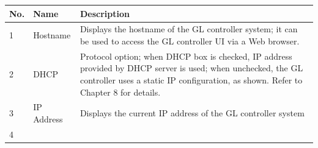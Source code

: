 \begin{longtable}[]{@{}lll@{}}
\toprule
\begin{minipage}[b]{0.04\columnwidth}\raggedright
No.\strut
\end{minipage} & \begin{minipage}[b]{0.23\columnwidth}\raggedright
Name\strut
\end{minipage} & \begin{minipage}[b]{0.65\columnwidth}\raggedright
Description\strut
\end{minipage}\tabularnewline
\midrule
\endhead
\begin{minipage}[t]{0.04\columnwidth}\raggedright
1\strut
\end{minipage} & \begin{minipage}[t]{0.23\columnwidth}\raggedright
Hostname\strut
\end{minipage} & \begin{minipage}[t]{0.65\columnwidth}\raggedright
Displays the hostname of the GL controller system; it can be used to
access the GL controller UI via a Web browser.\strut
\end{minipage}\tabularnewline
\begin{minipage}[t]{0.04\columnwidth}\raggedright
2\strut
\end{minipage} & \begin{minipage}[t]{0.23\columnwidth}\raggedright
DHCP\strut
\end{minipage} & \begin{minipage}[t]{0.65\columnwidth}\raggedright
Protocol option; when DHCP box is checked, IP address provided by DHCP
server is used; when unchecked, the GL controller uses a static IP
configuration, as shown. Refer to Chapter 8 for details.\strut
\end{minipage}\tabularnewline
\begin{minipage}[t]{0.04\columnwidth}\raggedright
3\strut
\end{minipage} & \begin{minipage}[t]{0.23\columnwidth}\raggedright
IP Address\strut
\end{minipage} & \begin{minipage}[t]{0.65\columnwidth}\raggedright
Displays the current IP address of the GL controller system\strut
\end{minipage}\tabularnewline
\begin{minipage}[t]{0.04\columnwidth}\raggedright
4\strut
\end{minipage} & \begin{minipage}[t]{0.23\columnwidth}\raggedright

\end{minipage}
\end{longtable}
